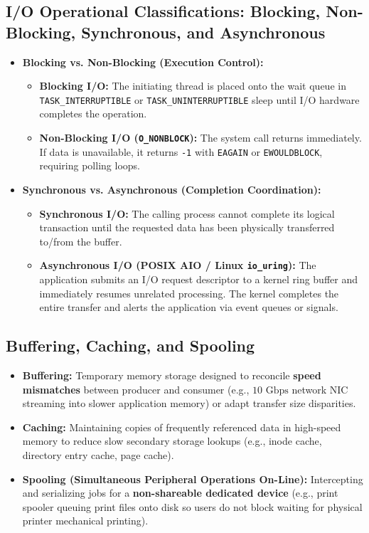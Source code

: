 \subsection{I/O Operational Classifications: Blocking, Non-Blocking, Synchronous, and Asynchronous}
\begin{itemize}
    \item \textbf{Blocking vs. Non-Blocking (Execution Control):}
    \begin{itemize}
        \item \textbf{Blocking I/O:} The initiating thread is placed onto the wait queue in \texttt{TASK\_INTERRUPTIBLE} or \texttt{TASK\_UNINTERRUPTIBLE} sleep until I/O hardware completes the operation.
        \item \textbf{Non-Blocking I/O (\texttt{O\_NONBLOCK}):} The system call returns immediately. If data is unavailable, it returns \texttt{-1} with \texttt{EAGAIN} or \texttt{EWOULDBLOCK}, requiring polling loops.
    \end{itemize}
    \item \textbf{Synchronous vs. Asynchronous (Completion Coordination):}
    \begin{itemize}
        \item \textbf{Synchronous I/O:} The calling process cannot complete its logical transaction until the requested data has been physically transferred to/from the buffer.
        \item \textbf{Asynchronous I/O (POSIX AIO / Linux \texttt{io\_uring}):} The application submits an I/O request descriptor to a kernel ring buffer and immediately resumes unrelated processing. The kernel completes the entire transfer and alerts the application via event queues or signals.
    \end{itemize}
\end{itemize}

\subsection{Buffering, Caching, and Spooling}
\begin{itemize}
    \item \textbf{Buffering:} Temporary memory storage designed to reconcile \textbf{speed mismatches} between producer and consumer (e.g., $10\text{ Gbps}$ network NIC streaming into slower application memory) or adapt transfer size disparities.
    \item \textbf{Caching:} Maintaining copies of frequently referenced data in high-speed memory to reduce slow secondary storage lookups (e.g., inode cache, directory entry cache, page cache).
    \item \textbf{Spooling (Simultaneous Peripheral Operations On-Line):} Intercepting and serializing jobs for a \textbf{non-shareable dedicated device} (e.g., print spooler queuing print files onto disk so users do not block waiting for physical printer mechanical printing).
\end{itemize}

